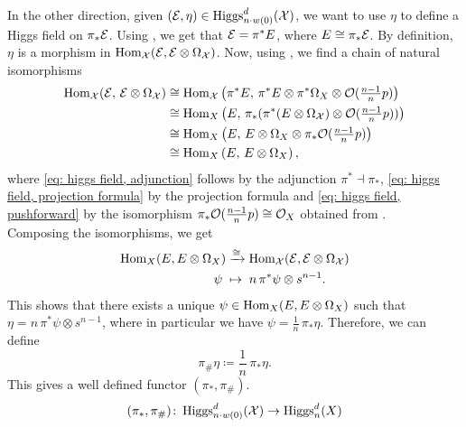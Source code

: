 \documentclass{article}
\begin{document}
In the other direction, given $(\mathcal{E}, \eta) \in \operatorname{Higgs}_{n \cdot w(0)}^d(\mathcal{X})$, we want to use $\eta$ to define a Higgs field on $\pi_* \mathcal{E}$.
Using , we get that $\mathcal{E} = \pi^*E$, where $E \cong \pi_* \mathcal{E}$. By definition, $\eta$ is a morphism in $\operatorname{Hom}_{\mathcal{X}}(\mathcal{E}, \mathcal{E}\otimes\Omega_{\mathcal{X}})$. Now, using , we find a chain of natural isomorphisms
\begin{align}
\operatorname{Hom}_{\mathcal{X}}(\mathcal{E}, \, \mathcal{E}\otimes\Omega_{\mathcal{X}}) & \cong \operatorname{Hom}_{\mathcal{X}}\left( \pi^*E, \, \pi^*E \otimes \pi^*\Omega_X \otimes \mathcal{O}(\tfrac{n-1}{n}p) \right)\\
& \cong \operatorname{Hom}_X\left( E, \, \pi_*(\pi^*(E \otimes \Omega_{\mathcal{X}}) \otimes \mathcal{O}(\tfrac{n-1}{n}p)) \right) \label{eq: higgs field, adjunction} \\
& \cong \operatorname{Hom}_X\left( E, \, E \otimes \Omega_X \otimes \pi_*\mathcal{O}(\tfrac{n-1}{n}p) \right) \label{eq: higgs field, projection formula} \\
& \cong \operatorname{Hom}_X\left( E, \, E \otimes \Omega_X \right), \label{eq: higgs field, pushforward}
\end{align}
where \eqref{eq: higgs field, adjunction} follows by the adjunction $\pi^* \dashv \pi_*$, \eqref{eq: higgs field, projection formula} by the projection formula and \eqref{eq: higgs field, pushforward} by the isomorphism $\pi_* \mathcal{O}(\tfrac{n-1}{n}p) \cong \mathcal{O}_X$ obtained from \cite[Corollary 1.2.13]{Taams}. \\
Composing the isomorphisms, we get
\begin{align}
	\operatorname{Hom}_X(E, E \otimes \Omega_X) &\xrightarrow{\cong} \operatorname{Hom}_{\mathcal{X}}(\mathcal{E}, \mathcal{E}\otimes \Omega_{\mathcal{X}}) \\
	\psi \; &\mapsto \; n \, \pi^* \psi \otimes s^{n-1}.
\end{align}
This shows that there exists a unique $\psi \in \operatorname{Hom}_X(E, E \otimes \Omega_X)$ such that $\eta = n \, \pi^* \psi \otimes s^{n-1}$, where in particular we have $\psi = \frac{1}{n} \, \pi_* \eta$. Therefore, we can define
\[
\pi_{\#}\eta \coloneqq \frac{1}{n} \, \pi_* \eta.
\]
This gives a well defined functor $(\pi_*, \pi_{\#})$.
\begin{equation}
(\pi_*, \pi_{\#}) \colon \operatorname{Higgs}_{n \cdot w(0)}^d(\mathcal{X}) \to \operatorname{Higgs}_n^d(X)
\end{equation}
\end{document}
